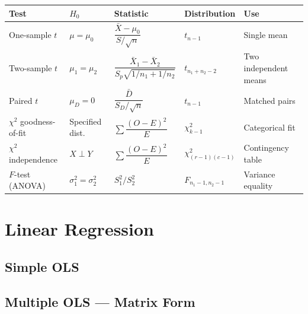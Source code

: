 \documentclass[oneside]{book}
\begin{document}
\begin{center}
\begin{tabularx}{\linewidth}{lllXl}
\toprule
\textbf{Test} & \textbf{$H_0$} & \textbf{Statistic} & \textbf{Distribution} & \textbf{Use} \\
\midrule
One-sample $t$       & $\mu = \mu_0$     & $\dfrac{\bar{X}-\mu_0}{S/\sqrt{n}}$ & $t_{n-1}$ & Single mean \\[8pt]
Two-sample $t$       & $\mu_1 = \mu_2$   & $\dfrac{\bar{X}_1-\bar{X}_2}{S_p\sqrt{1/n_1+1/n_2}}$ & $t_{n_1+n_2-2}$ & Two independent means \\[8pt]
Paired $t$           & $\mu_D = 0$       & $\dfrac{\bar{D}}{S_D/\sqrt{n}}$ & $t_{n-1}$ & Matched pairs \\[8pt]
$\chi^2$ goodness-of-fit & Specified dist. & $\sum \dfrac{(O-E)^2}{E}$ & $\chi^2_{k-1}$ & Categorical fit \\[8pt]
$\chi^2$ independence & $X \perp Y$      & $\sum \dfrac{(O-E)^2}{E}$ & $\chi^2_{(r-1)(c-1)}$ & Contingency table \\[8pt]
$F$-test (ANOVA)     & $\sigma_1^2 = \sigma_2^2$ & $S_1^2/S_2^2$ & $F_{n_1-1,n_2-1}$ & Variance equality \\
\bottomrule
\end{tabularx}
\end{center}

\section{Linear Regression}

\subsection*{Simple OLS}


\subsection*{Multiple OLS — Matrix Form}
\end{document}

